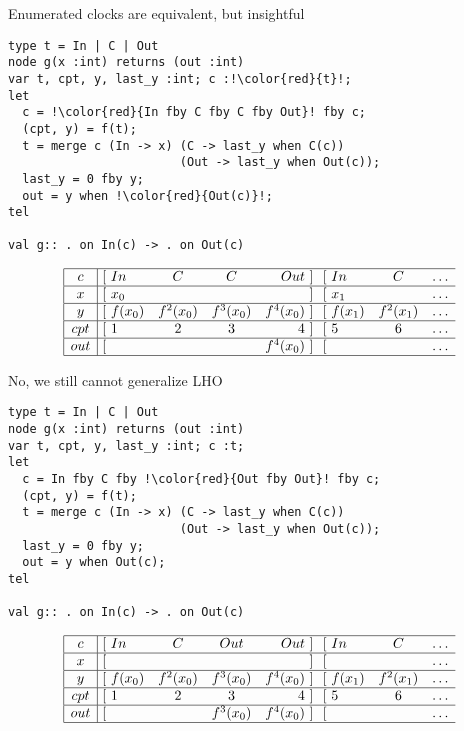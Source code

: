 \documentclass[xcolor=dvipsnames]{beamer}
\def\li{\\ \hline}
\begin{document}
\begin{frame}[fragile]{Enumerated clocks are equivalent, but insightful}
\begin{lstlisting}[escapechar=!]
type t = In | C | Out
node g(x :int) returns (out :int)
var t, cpt, y, last_y :int; c :!\color{red}{t}!;
let
  c = !\color{red}{In fby C fby C fby Out}! fby c;
  (cpt, y) = f(t);
  t = merge c (In -> x) (C -> last_y when C(c))
                        (Out -> last_y when Out(c));
  last_y = 0 fby y;
  out = y when !\color{red}{Out(c)}!;
tel

val g:: . on In(c) -> . on Out(c)
\end{lstlisting}
\[
\begin{array}{|c|@{\ [\ }lccr@{\ ]\ }@{\ [\ }lccr@{\ ]\ }@{\ [\ }lr@{\ ]\ }c} \hline
c & In     & C       & C        & Out     & In     & C       &   \ldots\li
x & x_0    &         &          &         & x_1    &         &   \ldots\li
y & f(x_0) & f^2(x_0)& f^3(x_0) & f^4(x_0)& f(x_1) & f^2(x_1)&   \ldots\li
cpt & 1 & 2 & 3 & 4 & 5 & 6 &\ldots\li
out &      &         &          & f^4(x_0)&        &         &   \ldots\li
\end{array}
\]
\end{frame}

\begin{frame}[fragile]{No, we still cannot generalize LHO}
\begin{lstlisting}[escapechar=!]
type t = In | C | Out
node g(x :int) returns (out :int)
var t, cpt, y, last_y :int; c :t;
let
  c = In fby C fby !\color{red}{Out fby Out}! fby c;
  (cpt, y) = f(t);
  t = merge c (In -> x) (C -> last_y when C(c))
                        (Out -> last_y when Out(c));
  last_y = 0 fby y;
  out = y when Out(c);
tel

val g:: . on In(c) -> . on Out(c)
\end{lstlisting}
\[
\begin{array}{|c|@{\ [\ }lccr@{\ ]\ }@{\ [\ }lccr@{\ ]\ }@{\ [\ }lr@{\ ]\ }c} \hline
c & In      & C       & Out    & Out   & In   & C     &   \ldots\\ \hline
x &        &         &        &       &      &       &   \ldots\\ \hline
y & f(x_0)   & f^2(x_0)  & f^3(x_0) & f^4(x_0)& f(x_1) & f^2(x_1)&   \ldots\\ \hline
cpt & 1 & 2 & 3 & 4 & 5 & 6 &\ldots\li
out &      &         & f^3(x_0) & f^4(x_0)&      &       &   \ldots\\ \hline
\end{array}
\]
\end{frame}
\end{document}
